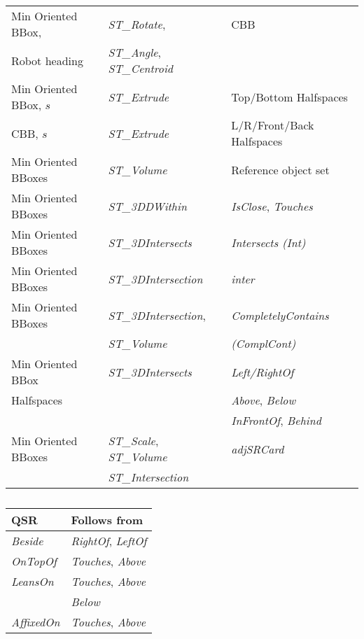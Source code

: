 \documentclass{article}
\begin{document}
\begin{table*}[t]
\begin{subtable}[t]{0.45\textwidth}
\begin{tabular}{l | l | l}
        Min Oriented BBox, & \textit{ST\_Rotate}, & CBB  \\ 
        Robot heading & \textit{ST\_Angle}, \textit{ST\_Centroid} & \\ \hline 
        Min Oriented BBox, $s$ & \textit{ST\_Extrude} & Top/Bottom Halfspaces\\ \hline
        CBB, $s$ & \textit{ST\_Extrude} & L/R/Front/Back Halfspaces\\ \hline
       Min Oriented BBoxes & \textit{ST\_Volume} & Reference object set\\ \hline
       Min Oriented BBoxes & \textit{ST\_3DDWithin} & \textit{IsClose}, \textit{Touches}\\ \hline
       Min Oriented BBoxes & \textit{ST\_3DIntersects} & \textit{Intersects (Int)}\\ \hline
       Min Oriented BBoxes & \textit{ST\_3DIntersection} & \textit{inter}\\ \hline
       Min Oriented BBoxes & \textit{ST\_3DIntersection}, & \textit{CompletelyContains}\\ 
       &\textit{ST\_Volume} & \textit{(ComplCont)}\\\hline
       Min Oriented BBox & \textit{ST\_3DIntersects} & \textit{Left/RightOf}\\ 
       Halfspaces & & \textit{Above}, \textit{Below} \\
       & & \textit{InFrontOf}, \textit{Behind}\\\hline
       Min Oriented BBoxes & \textit{ST\_Scale}, \textit{ST\_Volume} & \textit{adjSRCard} \\
        & \textit{ST\_Intersection} & \\\hline
       \end{tabular}
       \caption{}
       \label{tab:coverage}
    \end{subtable}
    \hfill
    \begin{subtable}[t]{0.35\textwidth}
        \centering
        \begin{tabular}{l | l  }
        \textbf{QSR} & \textbf{Follows from} \\
        \midrule
        \textit{Beside} & \textit{RightOf}, \textit{LeftOf} \\ \hline 
        \textit{OnTopOf} &  \textit{Touches}, \textit{Above}\\ \hline
        \textit{LeansOn} & \textit{Touches}, \textit{Above} \\ 
        & \textit{Below} \\\hline
        \textit{AffixedOn} & \textit{Touches}, \textit{Above}  \\ \hline

\end{tabular}
\end{subtable}
\end{table*}
\end{document}
